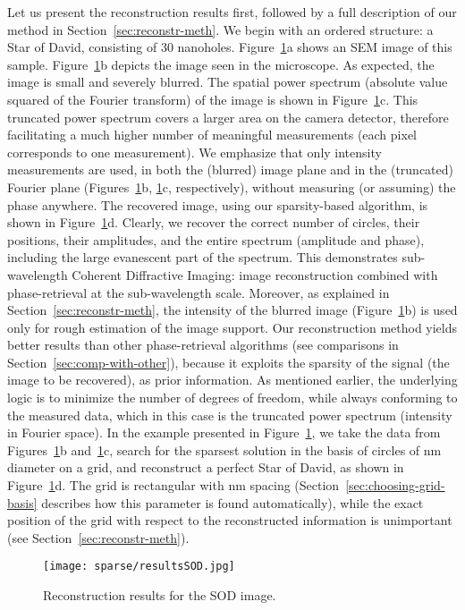 Let us present the reconstruction results first, followed by a full
description of our method in Section~\ref{sec:reconstr-meth}.  We
begin with an ordered structure: a Star of David, consisting of 30
nanoholes. Figure~\ref{fig:sod-main-results}a shows an SEM image of
this sample.  Figure~\ref{fig:sod-main-results}b depicts the image
seen in the microscope. As expected, the image is small and severely
blurred. The spatial power spectrum (absolute value squared of the
Fourier transform) of the image is shown in
Figure~\ref{fig:sod-main-results}c. This truncated power spectrum
covers a larger area on the camera detector, therefore facilitating a
much higher number of meaningful measurements (each pixel corresponds
to one measurement). We emphasize that only intensity measurements are
used, in both the (blurred) image plane and in the (truncated) Fourier
plane (Figures~\ref{fig:sod-main-results}b,
\ref{fig:sod-main-results}c, respectively), without measuring (or
assuming) the phase anywhere. The recovered image, using our
sparsity-based algorithm, is shown in
Figure~\ref{fig:sod-main-results}d.  Clearly, we recover the correct
number of circles, their positions, their amplitudes, and the entire
spectrum (amplitude and phase), including the large evanescent part of
the spectrum. This demonstrates sub-wavelength Coherent Diffractive
Imaging: image reconstruction combined with phase-retrieval at the
sub-wavelength scale. Moreover, as explained in
Section~\ref{sec:reconstr-meth}, the intensity of the blurred image
(Figure~\ref{fig:sod-main-results}b) is used only for rough estimation
of the image support. Our reconstruction method yields better results
than other phase-retrieval algorithms (see comparisons in
Section~\ref{sec:comp-with-other}), because it exploits the sparsity
of the signal (the image to be recovered), as prior information. As
mentioned earlier, the underlying logic is to minimize the number of
degrees of freedom, while always conforming to the measured data,
which in this case is the truncated power spectrum (intensity in
Fourier space). In the example presented in
Figure~\ref{fig:sod-main-results}, we take the data from
Figures~\ref{fig:sod-main-results}b and~\ref{fig:sod-main-results}c,
search for the sparsest solution in the basis of circles of \unit[100]{nm}
diameter on a grid, and reconstruct a perfect Star of David, as shown
in Figure~\ref{fig:sod-main-results}d. The grid is rectangular with
\unit[100]{nm}  spacing
(Section~\ref{sec:choosing-grid-basis} describes how this parameter is
found automatically), while the exact position of the grid with
respect to the reconstructed information is unimportant (see
Section~\ref{sec:reconstr-meth}).
\begin{figure}[H]
  \centering
  \texttt{[image: sparse/resultsSOD.jpg]}
  \caption{Reconstruction results for the SOD image.}
  \label{fig:sod-main-results}
\end{figure}

